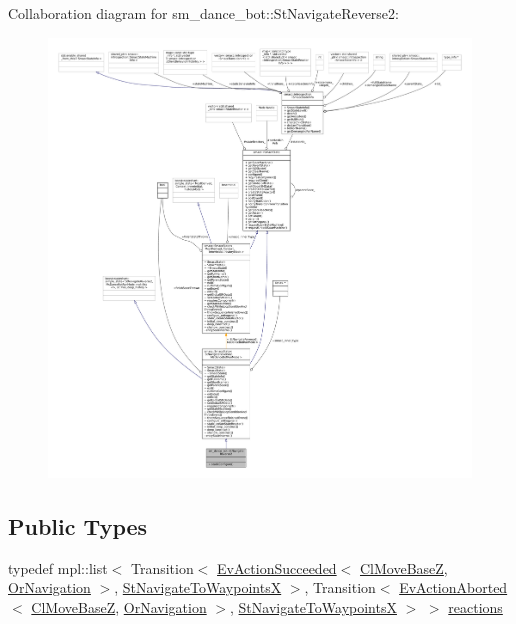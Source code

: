 Collaboration diagram for sm\+\_\+dance\+\_\+bot\+:\+:St\+Navigate\+Reverse2\+:
\nopagebreak
\begin{figure}[H]
\begin{center}
\leavevmode
\includegraphics[width=350pt]{structsm__dance__bot_1_1StNavigateReverse2__coll__graph}
\end{center}
\end{figure}
\subsection*{Public Types}
\begin{DoxyCompactItemize}
\item 
typedef mpl\+::list$<$ Transition$<$ \hyperlink{structsmacc_1_1default__events_1_1EvActionSucceeded}{Ev\+Action\+Succeeded}$<$ \hyperlink{classcl__move__base__z_1_1ClMoveBaseZ}{Cl\+Move\+BaseZ}, \hyperlink{classsm__dance__bot_1_1OrNavigation}{Or\+Navigation} $>$, \hyperlink{structsm__dance__bot_1_1StNavigateToWaypointsX}{St\+Navigate\+To\+WaypointsX} $>$, Transition$<$ \hyperlink{structsmacc_1_1default__events_1_1EvActionAborted}{Ev\+Action\+Aborted}$<$ \hyperlink{classcl__move__base__z_1_1ClMoveBaseZ}{Cl\+Move\+BaseZ}, \hyperlink{classsm__dance__bot_1_1OrNavigation}{Or\+Navigation} $>$, \hyperlink{structsm__dance__bot_1_1StNavigateToWaypointsX}{St\+Navigate\+To\+WaypointsX} $>$ $>$ \hyperlink{structsm__dance__bot_1_1StNavigateReverse2_a629dbeb24a7b120d7dfebeb4b9630d64}{reactions}
\end{DoxyCompactItemize}
